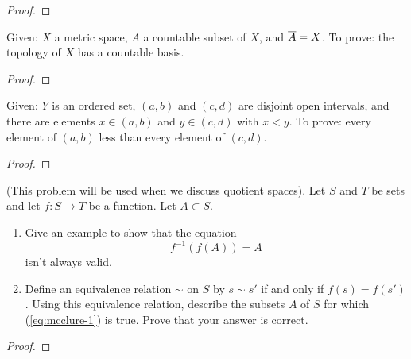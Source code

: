 \begin{proof}
\end{proof}
\newpage
\begin{problem}[A]
Given: $X$ a metric space, $A$ a countable subset of $X$, and
$\overline{A}=X$. To prove: the topology of $X$ has a countable
basis.
\end{problem}
\begin{proof}
\end{proof}
\newpage
\begin{problem}[B]
Given: $Y$ is an ordered set, $(a,b)$ and $(c,d)$ are disjoint
open intervals, and there are elements $x\in(a,b)$ and
$y\in(c,d)$ with $x<y$. To prove: every element of $(a,b)$ less
than every element of $(c,d)$.
\end{problem}
\begin{proof}
\end{proof}
\newpage
\begin{problem}[C]
(This problem will be used when we discuss quotient spaces). Let
$S$ and $T$ be sets and let $f\colon S\to T$ be a function. Let
$A\subset S$.
\begin{enumerate}[noitemsep,label=(\roman*)]
\item Give an example to show that the equation
\begin{equation}
\label{eq:mcclure-1}
\tag{*}
f^{-1}(f(A))=A
\end{equation}
isn't always valid.
\item Define an equivalence relation $\sim$ on $S$ by $s\sim s'$
  if and only if $f(s)=f(s')$. Using this equivalence relation,
  describe the subsets $A$ of $S$ for which (\ref{eq:mcclure-1}) is
  true. Prove that your answer is correct.
\end{enumerate}
\end{problem}
\begin{proof}
\end{proof}

